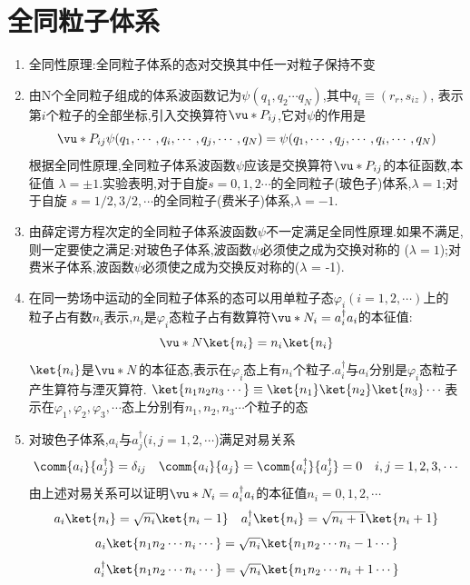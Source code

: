     \section{全同粒子体系}

        \begin{formal}
        \begin{enumerate}
            \item 全同性原理:全同粒子体系的态对交换其中任一对粒子保持不变
            \item 由N个全同粒子组成的体系波函数记为$\psi(q_{1},q_{2}\cdots q_{N})$,其中$q_{i} \equiv (r_{r},s_{iz})$,
                  表示第$i$个粒子的全部坐标,引入交换算符$\vu*{P}_{ij}$,它对$\psi$的作用是
                  $$
                  \vu*{P}_{ij} \psi(q_{1},\cdots,q_{i},\cdots,q_{j},\cdots,q_{N}) = \psi(q_{1},\cdots,q_{j},\cdots,q_{i},\cdots,q_{N})
                  $$
                  根据全同性原理,全同粒子体系波函数$\psi$应该是交换算符$\vu*{P}_{ij}$的本征函数,本征值
                  $\lambda=\pm 1$.实验表明,对于自旋$s=0,1,2\cdots$的全同粒子(玻色子)体系,$\lambda=1$;对于自旋
                  $s = 1/2,3/2,\cdots$的全同粒子(费米子)体系,$\lambda=-1$.

            \item 由薛定谔方程次定的全同粒子体系波函数$\psi$不一定满足全同性原理.如果不满足,则一定要使之满足:对玻色子体系,波函数$\psi$必须使之成为交换对称的
                  ($\lambda=1$);对费米子体系,波函数$\psi$必须使之成为交换反对称的($\lambda$ = -1).

            \item 在同一势场中运动的全同粒子体系的态可以用单粒子态$\varphi_{i}(i=1,2,\cdots)$上的
                  粒子占有数$n_{i}$表示,$n_{i}$是$\varphi_{i}$态粒子占有数算符$\vu*{N}_{i}=a^{\dagger}_{i}a_{i}$的本征值:
                  $$ \vu*{N}\ket{n_{i}} = n_{i} \ket{n_{i}} $$
                  $\ket{n_{i}}$是$\vu*{N}$的本征态,表示在$\varphi_{i}$态上有$n_{i}$个粒子.$a_{i}^{\dagger}$与$a_{i}$分别是$\varphi_{i}$态粒子
                  产生算符与湮灭算符. $ \ket{n_{1}n_{2}n_{3}\cdots} \equiv \ket{n_{1}} \ket{n_{2}} \ket{n_{3}} \cdots 
                  $表示在$\varphi_{1},\varphi_{2},\varphi_{3},\cdots$态上分别有$n_{1},n_{2},n_{3} \cdots$个粒子的态  
                  
            \item 对玻色子体系,$a_{i}$与$a_{j}^{\dagger}$($i,j=1,2,\cdots$)满足对易关系
                  $$ 
                  \comm{a_{i}}{a_{j}^{\dagger}} = \delta_{ij} \quad 
                  \comm{a_{i}}{a_{j}} = \comm{a_{i}^{\dagger}}{a_{j}^{\dagger}} = 0 \quad i,j=1,2,3,\cdots
                  $$
                  由上述对易关系可以证明$\vu*{N}_{i} = a_{i}^{\dagger} a_{i} $的本征值$n_{i} = 0,1,2,\cdots$
                  $$ a_{i} \ket{n_{i}} = \sqrt{n_{i}} \ket{n_{i} - 1} \quad a_{i}^{\dagger} \ket{n_{i}} = \sqrt{n_{i}+1} \ket{n_{i} + 1} $$
                  $$ a_{i} \ket{n_{1}n_{2}\cdots n_{i}\cdots}  = \sqrt{n_{i}} \ket{n_{1}n_{2}\cdots n_{i}-1 \cdots} $$
                  $$ a_{i}^{\dagger} \ket{n_{1}n_{2}\cdots n_{i}\cdots}  = \sqrt{n_{i}} \ket{n_{1}n_{2}\cdots n_{i}+1 \cdots} $$


\end{enumerate}
\end{formal}
